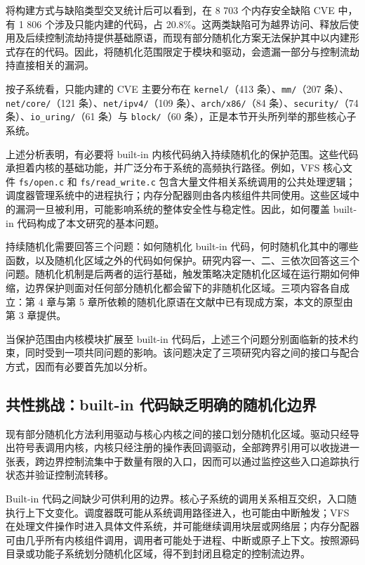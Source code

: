 将构建方式与缺陷类型交叉统计后可以看到，在 8 703 个内存安全缺陷 CVE 中，有 1 806 个涉及只能内建的代码，占 20.8\%。这两类缺陷可为越界访问、释放后使用及后续控制流劫持提供基础原语，而现有部分随机化方案无法保护其中以内建形式存在的代码。因此，将随机化范围限定于模块和驱动，会遗漏一部分与控制流劫持直接相关的漏洞。

按子系统看，只能内建的 CVE 主要分布在 \lstinline[breaklines=false]@kernel/@（413 条）、\lstinline[breaklines=false]@mm/@（207 条）、\lstinline[breaklines=false]@net/core/@（121 条）、\lstinline[breaklines=false]@net/ipv4/@（109 条）、\lstinline[breaklines=false]@arch/x86/@（84 条）、\lstinline[breaklines=false]@security/@（74 条）、\lstinline[breaklines=false]@io_uring/@（61 条）与 \lstinline[breaklines=false]@block/@（60 条），正是本节开头所列举的那些核心子系统。

上述分析表明，有必要将 built-in 内核代码纳入持续随机化的保护范围。这些代码承担着内核的基础功能，并广泛分布于系统的高频执行路径。例如，VFS 核心文件 \lstinline[breaklines=false]@fs/open.c@ 和 \lstinline[breaklines=false]@fs/read_write.c@ 包含大量文件相关系统调用的公共处理逻辑；调度器管理系统中的进程执行；内存分配器则由各内核组件共同使用。这些区域中的漏洞一旦被利用，可能影响系统的整体安全性与稳定性。因此，如何覆盖 built-in 代码构成了本文研究的基本问题。

持续随机化需要回答三个问题：如何随机化 built-in 代码，何时随机化其中的哪些函数，以及随机化区域之外的代码如何保护。研究内容一、二、三依次回答这三个问题。随机化机制是后两者的运行基础，触发策略决定随机化区域在运行期如何伸缩，边界保护则面对任何部分随机化都会留下的非随机化区域。三项内容各自成立：第 4 章与第 5 章所依赖的随机化原语在文献中已有现成方案，本文的原型由第 3 章提供。

当保护范围由内核模块扩展至 built-in 代码后，上述三个问题分别面临新的技术约束，同时受到一项共同问题的影响。该问题决定了三项研究内容之间的接口与配合方式，因而有必要首先加以分析。

\subsection{共性挑战：built-in 代码缺乏明确的随机化边界}

现有部分随机化方法利用驱动与核心内核之间的接口划分随机化区域。驱动只经导出符号表调用内核，内核只经注册的操作表回调驱动，全部跨界引用可以收拢进一张表，跨边界控制流集中于数量有限的入口，因而可以通过监控这些入口追踪执行状态并验证控制流转移。

Built-in 代码之间缺少可供利用的边界。核心子系统的调用关系相互交织，入口随执行上下文变化。调度器既可能从系统调用路径进入，也可能由中断触发；VFS 在处理文件操作时进入具体文件系统，并可能继续调用块层或网络层；内存分配器可由几乎所有内核组件调用，调用者可能处于进程、中断或原子上下文。按照源码目录或功能子系统划分随机化区域，得不到封闭且稳定的控制流边界。

